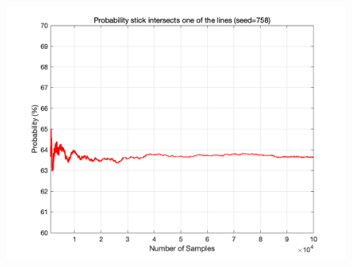 \documentclass{article}
\begin{document}
\newpage
\begin{figure}
    \includegraphics[width=\linewidth]{q4.png}
\end{figure}
\end{document}

